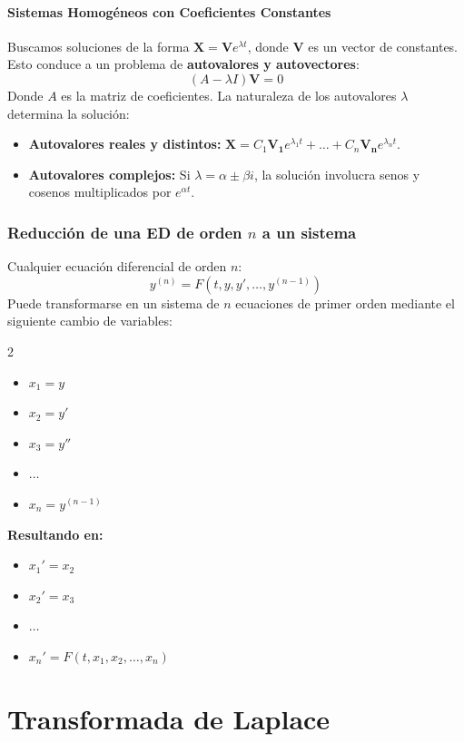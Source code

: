 \documentclass[a4paper,12pt]{article}
\begin{document}
 \subsection{Sistemas Homogéneos con Coeficientes Constantes}
 Buscamos soluciones de la forma $\mathbf{X} = \mathbf{V}e^{\lambda t}$, donde $\mathbf{V}$ es un vector de constantes. Esto conduce a un problema de \textbf{autovalores y autovectores}:
 $$ (A - \lambda I)\mathbf{V} = 0 $$
 Donde $A$ es la matriz de coeficientes. La naturaleza de los autovalores $\lambda$ determina la solución:
 \begin{itemize}
     \item \textbf{Autovalores reales y distintos:} $\mathbf{X} = C_1 \mathbf{V_1} e^{\lambda_1 t} + \dots + C_n \mathbf{V_n} e^{\lambda_n t}$.
     \item \textbf{Autovalores complejos:} Si $\lambda = \alpha \pm \beta i$, la solución involucra senos y cosenos multiplicados por $e^{\alpha t}$.
 \end{itemize}

 \section{Reducción de una ED de orden $n$ a un sistema}
 Cualquier ecuación diferencial de orden $n$:
 $$ y^{(n)} = F(t, y, y', \dots, y^{(n-1)}) $$
 Puede transformarse en un sistema de $n$ ecuaciones de primer orden mediante el siguiente cambio de variables:
 \begin{multicols}{2}
 \begin{itemize}
     \item $x_1 = y$
     \item $x_2 = y'$
     \item $x_3 = y''$
     \item $\dots$
     \item $x_n = y^{(n-1)}$
 \end{itemize}
 \columnbreak
 \textbf{Resultando en:}
 \begin{itemize}
     \item $x_1' = x_2$
     \item $x_2' = x_3$
     \item $\dots$
     \item $x_n' = F(t, x_1, x_2, \dots, x_n)$
 \end{itemize}
 \end{multicols}

 \newpage
 \part{Transformada de Laplace}
\end{document}
